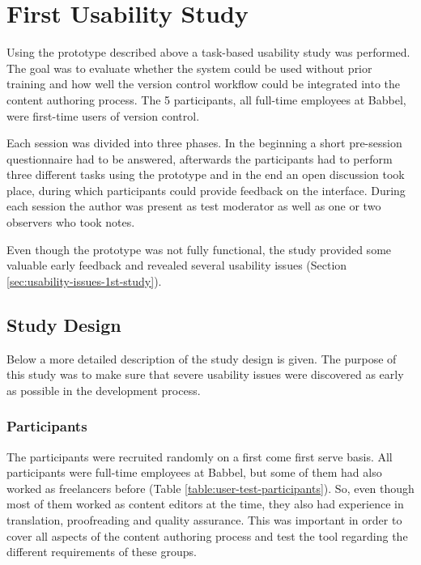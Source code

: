 \chapter{First Usability Study} \label{chapter:first-iteration}
Using the prototype described above a task-based usability study was performed. The goal was to evaluate whether the system could be used without prior training and how well the version control workflow could be integrated into the content authoring process. The 5 participants, all full-time employees at Babbel, were first-time users of version control.

Each session was divided into three phases. In the beginning a short pre-session questionnaire had to be answered, afterwards the participants had to perform three different tasks using the prototype and in the end an open discussion took place, during which participants could provide feedback on the interface. During each session the author was present as test moderator as well as one or two observers who took notes.

Even though the prototype was not fully functional, the study provided some valuable early feedback and revealed several usability issues (Section  \ref{sec:usability-issues-1st-study}).

\section{Study Design}
Below a more detailed description of the study design is given. The purpose of this study was to make sure that severe usability issues were discovered as early as possible in the development process.

\subsection{Participants}
The participants were recruited randomly on a first come first serve basis. All participants were full-time employees at Babbel, but some of them had also worked as freelancers before (Table \ref{table:user-test-participants}). So, even though most of them worked as content editors at the time, they also had experience in translation, proofreading and quality assurance. This was important in order to cover all aspects of the content authoring process and test the tool regarding the different requirements of these groups.

